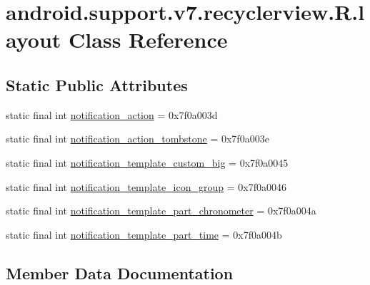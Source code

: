 \hypertarget{classandroid_1_1support_1_1v7_1_1recyclerview_1_1R_1_1layout}{}\section{android.\+support.\+v7.\+recyclerview.\+R.\+layout Class Reference}
\label{classandroid_1_1support_1_1v7_1_1recyclerview_1_1R_1_1layout}
\subsection*{Static Public Attributes}
\begin{DoxyCompactItemize}
\item 
static final int \mbox{\hyperlink{classandroid_1_1support_1_1v7_1_1recyclerview_1_1R_1_1layout_a5c58833d9a1b10d067f374aed5fa88f3}{notification\+\_\+action}} = 0x7f0a003d
\item 
static final int \mbox{\hyperlink{classandroid_1_1support_1_1v7_1_1recyclerview_1_1R_1_1layout_a7b89a41848c08f64c2517d5457a04b55}{notification\+\_\+action\+\_\+tombstone}} = 0x7f0a003e
\item 
static final int \mbox{\hyperlink{classandroid_1_1support_1_1v7_1_1recyclerview_1_1R_1_1layout_ac2dc852a8025f03f100cf21a2a854492}{notification\+\_\+template\+\_\+custom\+\_\+big}} = 0x7f0a0045
\item 
static final int \mbox{\hyperlink{classandroid_1_1support_1_1v7_1_1recyclerview_1_1R_1_1layout_ad5f28c2fee2a8a6a61a5f1e7529e5c07}{notification\+\_\+template\+\_\+icon\+\_\+group}} = 0x7f0a0046
\item 
static final int \mbox{\hyperlink{classandroid_1_1support_1_1v7_1_1recyclerview_1_1R_1_1layout_aadc2d80b4aa5be9930a4997995d03772}{notification\+\_\+template\+\_\+part\+\_\+chronometer}} = 0x7f0a004a
\item 
static final int \mbox{\hyperlink{classandroid_1_1support_1_1v7_1_1recyclerview_1_1R_1_1layout_ad713ea9b16efafde2a912cc78ef4bf05}{notification\+\_\+template\+\_\+part\+\_\+time}} = 0x7f0a004b
\end{DoxyCompactItemize}


\subsection{Member Data Documentation}
\mbox{\label{classandroid_1_1support_1_1v7_1_1recyclerview_1_1R_1_1layout_a5c58833d9a1b10d067f374aed5fa88f3}} 
